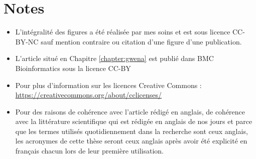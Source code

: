 \section{Notes}

\begin{itemize}
    \item L'intégralité des figures a été réalisée par mes soins et est sous licence CC-BY-NC sauf mention contraire ou citation d'une figure d'une publication.
    \item L'article situé en Chapitre \ref{chapter:gwena} est publié dans BMC Bioinformatics sous la licence CC-BY
    \item Pour plus d'information sur les licences Creative Commons : \url{https://creativecommons.org/about/cclicenses/}
    \item Pour des raisons de cohérence avec l'article rédigé en anglais, de cohérence avec la littérature scientifique qui est rédigée en anglais de nos jours et parce que les termes utilisés quotidiennement dans la recherche sont ceux anglais, les acronymes de cette thèse seront ceux anglais après avoir été explicité en français chacun lors de leur première utilisation.
\end{itemize}